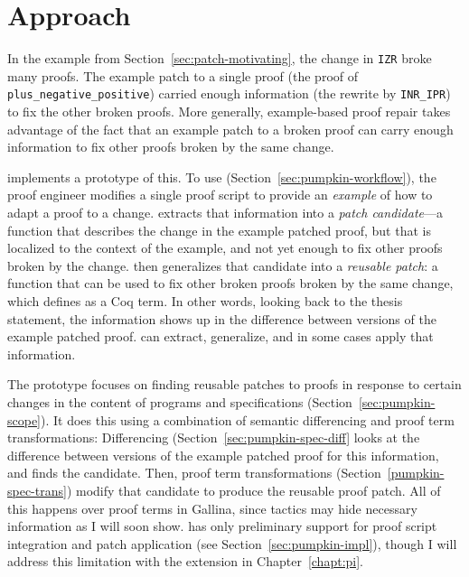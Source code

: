 \section{Approach}
\label{sec:pumpkin-approach}

In the example from Section~\ref{sec:patch-motivating}, the change in \lstinline{IZR} broke many proofs.
The example patch to a single proof (the proof of \lstinline{plus_negative_positive}) carried enough information (the rewrite by \lstinline{INR_IPR})
to fix the other broken proofs.
More generally, example-based proof repair takes advantage of the fact that an example patch to a broken proof can carry enough information to fix other proofs
broken by the same change.

\sysname implements a prototype of this.
To use \sysname (Section~\ref{sec:pumpkin-workflow}), the proof engineer modifies a single proof script to provide an \textit{example} of how to adapt a proof to a change.
\sysname extracts that information into a \textit{patch candidate}---a function that describes the change in the example patched proof,
but that is localized to the context of the example, and not yet enough to fix other proofs broken by the change.
\sysname then generalizes that candidate into a \textit{reusable patch}: a function
that can be used to fix other broken proofs broken by the same change, which \sysname defines as a Coq term.
In other words, looking back to the thesis statement, the information shows up in the difference between versions of the example patched proof.
\sysname can extract, generalize, and in some cases apply that information.

The \sysname prototype focuses on finding reusable patches to proofs in response to certain changes in the content of programs and specifications (Section~\ref{sec:pumpkin-scope}).
It does this using a combination of semantic differencing and proof term transformations:
Differencing (Section~\ref{sec:pumpkin-spec-diff} looks at the difference between versions of the example patched proof for this information, and finds the candidate.
Then, proof term transformations (Section~\ref{pumpkin-spec-trans}) modify that candidate to produce the reusable proof patch.
All of this happens over proof terms in Gallina, since tactics may hide necessary information as I will soon show.
\sysname has only preliminary support for proof script integration and patch application (see Section~\ref{sec:pumpkin-impl}),
though I will address this limitation with the \toolnamec extension in Chapter~\ref{chapt:pi}.

